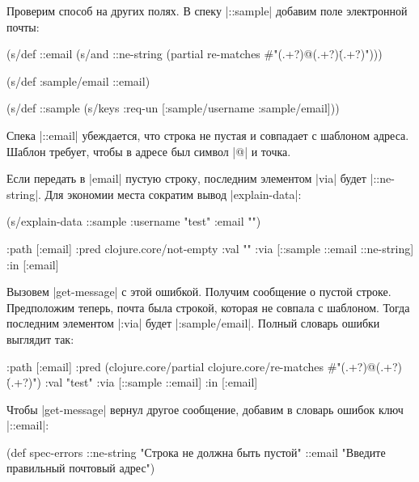 Проверим способ на других полях. В спеку \spverb|::sample| добавим поле
электронной почты:

\begin{english}
  \begin{clojure}
(s/def ::email
  (s/and
   ::ne-string
   (partial re-matches #"(.+?)@(.+?)\.(.+?)")))

(s/def :sample/email ::email)

(s/def ::sample
  (s/keys :req-un [:sample/username
                   :sample/email]))
  \end{clojure}
\end{english}

Спека \spverb|::email| убеждается, что строка не пустая и совпадает с шаблоном
адреса. Шаблон требует, чтобы в адресе был символ \spverb|@| и точка.

Если передать в \spverb|email| пустую строку, последним элементом \spverb|via|
будет \spverb|::ne-string|. Для экономии места сократим вывод
\spverb|explain-data|:

\begin{english}
  \begin{clojure}
(s/explain-data ::sample {:username "test" :email ""})

{:path [:email]
 :pred clojure.core/not-empty
 :val ""
 :via [::sample ::email ::ne-string]
 :in [:email]}
  \end{clojure}
\end{english}

Вызовем \spverb|get-message| с этой ошибкой. Получим сообщение о пустой
строке. Предположим теперь, почта была строкой, которая не совпала с
шаблоном. Тогда последним элементом \spverb|:via| будет
\spverb|:sample/email|. Полный словарь ошибки выглядит так:

\begin{english}
  \begin{clojure}
{:path [:email]
 :pred
 (clojure.core/partial
  clojure.core/re-matches
  #"(.+?)@(.+?)\.(.+?)")
 :val "test"
 :via [::sample ::email]
 :in [:email]}
  \end{clojure}
\end{english}

Чтобы \spverb|get-message| вернул другое сообщение, добавим в словарь ошибок
ключ \spverb|::email|:

  \begin{clojure}
(def spec-errors
  {::ne-string "Строка не должна быть пустой"
   ::email "Введите правильный почтовый адрес"})
  \end{clojure}

